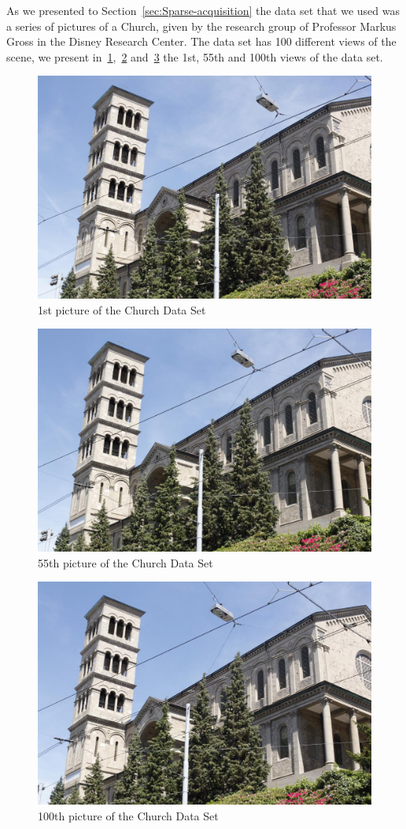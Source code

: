 \bigskip 

As we presented to Section~\ref{sec:Sparse-acquisition} the data set that we used was a series of pictures of a Church, given by the research group of Professor Markus Gross in the Disney Research Center. The data set has 100 different views of the scene, we present in~\ref{fig:first_church},~\ref{fig:second_church} and~\ref{fig:third_church} the 1st, 55th and 100th views of the data set.

\begin{figure}[h!]
\centering
\includegraphics[width = 0.7 \textwidth]{./Diagrams/results/data_set/church_image-raw_0000_lowres.jpg}
\caption{1st picture of the Church Data Set}
\label{fig:first_church}
\end{figure}

\begin{figure}[h!]
\centering
\includegraphics[width = 0.7 \textwidth]{./Diagrams/results/data_set/church_image-raw_0055_lowres.jpg}
\caption{55th picture of the Church Data Set}
\label{fig:second_church}
\end{figure}

\begin{figure}[h!]
\centering
\includegraphics[width = 0.7 \textwidth]{./Diagrams/results/data_set/church_image-raw_0100_lowres.jpg}
\caption{100th picture of the Church Data Set}
\label{fig:third_church}
\end{figure}


